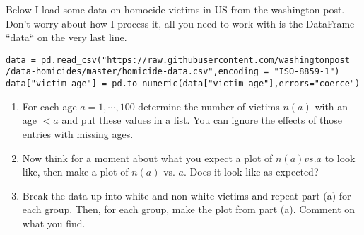 \begin{exercise}\label{ex:washpost}
Below I load some data on homocide victims in US from the washington post. Don't worry about how I process it, all you need to work with is the DataFrame ``data`` on the very last line.

\begin{Verbatim}
data = pd.read_csv("https://raw.githubusercontent.com/washingtonpost
/data-homicides/master/homicide-data.csv",encoding = "ISO-8859-1")
data["victim_age"] = pd.to_numeric(data["victim_age"],errors="coerce")
\end{Verbatim}
%

\begin{enumerate}[label=(\alph*)]
\item  For each age $a = 1,\cdots,100$ determine the number of victims $n(a)$ with an age $<a$ and put these values in a list. You can ignore the effects of those entries with missing ages. 
\item Now think for a moment about what you expect a plot of $n(a) vs. a$ to look like, then make a plot of $n(a)$ vs. $a$. Does it look like as expected?
\item Break the data up into white and non-white victims and repeat part (a) for each group. Then, for each group, make the plot from part (a). Comment on what you find. 
\end{enumerate}
%

\end{exercise}



